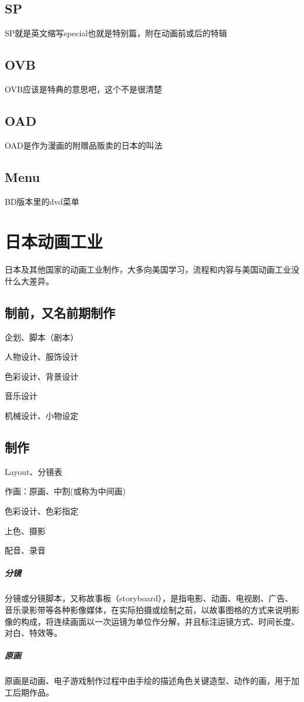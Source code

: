 \documentclass[UTF8,12pt]{ctexart}
\begin{document}
\subsection{SP}
SP就是英文缩写special也就是特别篇，附在动画前或后的特辑

\subsection{OVB}
OVB应该是特典的意思吧，这个不是很清楚


\subsection{OAD}
OAD是作为漫画的附赠品贩卖的日本的叫法


\subsection{Menu}
BD版本里的dvd菜单


\section{日本动画工业}
日本及其他国家的动画工业制作，大多向美国学习，流程和内容与美国动画工业没什么大差异。

\subsection{制前，又名前期制作}
企划、脚本（剧本）

人物设计、服饰设计

色彩设计、背景设计

音乐设计

机械设计、小物设定

\subsection{制作}
Layout、分镜表

作画：原画、中割(或称为中间画)

色彩设计、色彩指定

上色、摄影

配音、录音

\subparagraph{分镜}
分镜或分镜脚本，又称故事板（storyboard），是指电影、动画、电视剧、广告、音乐录影带等各种影像媒体，在实际拍摄或绘制之前，以故事图格的方式来说明影像的构成，将连续画面以一次运镜为单位作分解，并且标注运镜方式、时间长度、对白、特效等。
\subparagraph{原画}
原画是动画、电子游戏制作过程中由手绘的描述角色关键造型、动作的画，用于加工后期作品。
\end{document}
